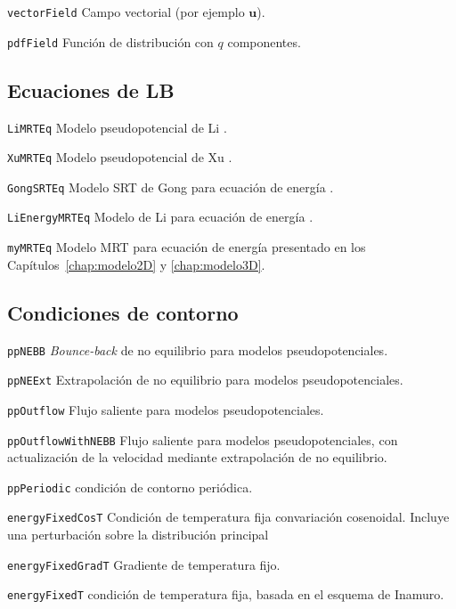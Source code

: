 \texttt{vectorField}\: Campo vectorial (por ejemplo $\bm{u}$).
\medskip

\texttt{pdfField}\: Funci\'on de distribuci\'on con $q$ componentes.



\subsection{Ecuaciones de LB}

\texttt{LiMRTEq}\: Modelo pseudopotencial de Li \cite{li_lattice_2013}.
\medskip

\texttt{XuMRTEq}\: Modelo pseudopotencial de Xu \cite{xu_three-dimensional_2015}.
\medskip

\texttt{GongSRTEq}\: Modelo SRT de Gong para ecuaci\'on de energ\'ia \cite{gong_lattice_2012}.
\medskip

\texttt{LiEnergyMRTEq}\: Modelo de Li para ecuaci\'on de energ\'ia \cite{li_improved_2017}.
\medskip

\texttt{myMRTEq}\: Modelo MRT para ecuaci\'on de energ\'ia presentado en los Cap\'itulos~\ref{chap:modelo2D} y \ref{chap:modelo3D}.



\subsection{Condiciones de contorno}

\texttt{ppNEBB}\: \emph{Bounce-back} de no equilibrio para modelos pseudopotenciales.
\medskip

\texttt{ppNEExt}\: Extrapolaci\'on de no equilibrio para modelos pseudopotenciales.
\medskip

\texttt{ppOutflow}\: Flujo saliente para modelos pseudopotenciales.
\medskip

\texttt{ppOutflowWithNEBB}\: Flujo saliente para modelos pseudopotenciales, con actualizaci\'on de la velocidad mediante extrapolaci\'on de no equilibrio.
\medskip

\texttt{ppPeriodic}\: condici\'on de contorno peri\'odica.
\medskip

\texttt{energyFixedCosT}\: Condici\'on de temperatura fija convariaci\'on cosenoidal. Incluye una perturbaci\'on sobre la distribuci\'on principal
\medskip

\texttt{energyFixedGradT}\: Gradiente de temperatura fijo.
\medskip

\texttt{energyFixedT}\: condici\'on de temperatura fija, basada en el esquema de Inamuro.
\medskip

